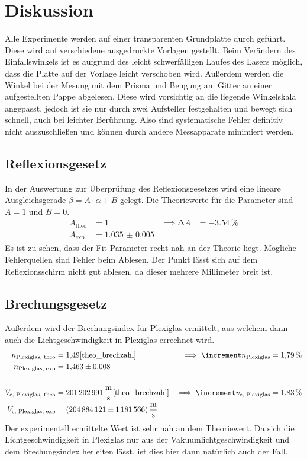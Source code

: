\section{Diskussion}
\label{sec:Diskussion}

Alle Experimente werden auf einer transparenten Grundplatte durch geführt. Diese wird auf verschiedene ausgedruckte Vorlagen gestellt. Beim Verändern des 
Einfallswinkels ist es aufgrund des leicht schwerfälligen Laufes des Lasers möglich, dass die Platte auf der Vorlage leicht verschoben wird. 
Außerdem werden die Winkel bei der Mesung mit dem Prisma und Beugung am Gitter an einer aufgestellten Pappe abgelesen. Diese wird vorsichtig an die liegende
Winkelskala angepasst, jedoch ist sie nur durch zwei Aufsteller festgehalten und bewegt sich schnell, auch bei leichter Berührung. 
Also sind systematische Fehler definitiv nicht auszuschließen und können durch andere Messapparate minimiert werden. 

\subsection{Reflexionsgesetz}

  In der Auswertung zur Überprüfung des Reflexionsgesetzes wird eine lineare Ausgleichsgerade $\beta = A \cdot \alpha + B$ gelegt. Die Theoriewerte für die 
  Parameter sind $A = 1$ und $B=0$. 
  \begin{align*}
    A_{\text{theo}} &= \num{1} & \implies \increment A &= \SI{-3.54}{\percent} \\
    A_{\text{exp}} &= \num{1.035(5)} 
  \end{align*}
  Es ist zu sehen, dass der Fit-Parameter recht nah an der Theorie liegt. Mögliche Fehlerquellen sind Fehler beim Ablesen. Der Punkt lässt sich auf dem Reflexionsschirm 
  nicht gut ablesen, da dieser mehrere Millimeter breit ist. 

\subsection{Brechungsgesetz} 

  Außerdem wird der Brechungsindex für Plexiglas ermittelt, aus welchem dann auch die Lichtgeschwindigkeit in Plexiglas errechnet wird. 
  \begin{align*}
    n_{\text{Plexiglas, theo}} &= \num{1.49}  \text{\cite{theo_brechzahl}} & \implies \increment n_{\text{Plexiglas}} &= \SI{1.79}{\percent}\\
    n_{\text{Plexiglas, exp}} &= \num{1.463(8)}\\
    \\
    V_{\text{c, Plexiglas, theo}} &= \SI{201202991}{\metre\per\second} \text{\cite{theo_brechzahl}} & \implies \increment v_{\text{c, Plexiglas}} &= \SI{1.83}{\percent}\\
    V_{\text{c, Plexiglas, exp}} &= \SI{204884121(1181566)}{\metre\per\second} 
  \end{align*}
  Der experimentell ermittelte Wert ist sehr nah an dem Theoriewert. Da sich die Lichtgeschwindigkeit in Plexiglas nur aus der Vakuumlichtgeschwindigkeit und 
  dem Brechungsindex herleiten lässt, ist dies hier dann natürlich auch der Fall. 


